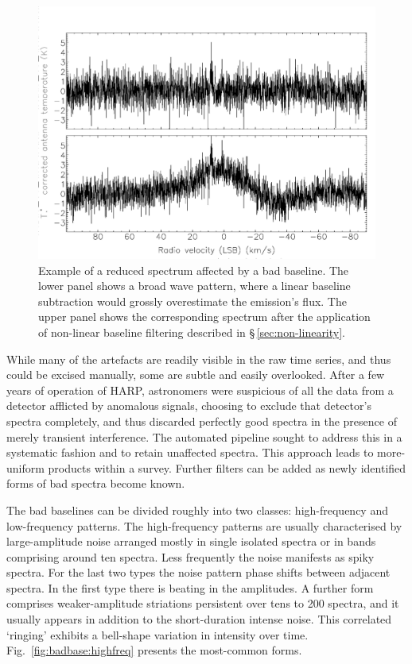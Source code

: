 \documentclass[a4paper,fleqn,usenatbib]{mnras}
\begin{document}
\begin{figure}
\includegraphics[width=\columnwidth]{badbaseline_spectrum_example}
\caption{Example of a reduced spectrum affected by a bad baseline.
  The lower panel shows a broad wave pattern, where a linear baseline
  subtraction would grossly overestimate the emission's flux.  The upper
  panel shows the corresponding spectrum after the application of
  non-linear baseline filtering described in \S\,\ref{sec:non-linearity}.}
\label{fig:badbase:spectrum}
\end{figure}


While many of the artefacts are readily visible in the raw time
series, and thus could be excised manually, some are subtle and easily
overlooked.  After a few years of operation of HARP, astronomers were
suspicious of all the data from a detector afflicted by anomalous signals,
choosing to exclude that detector's spectra completely, and thus
discarded perfectly good spectra in the presence of merely transient
interference.  The automated pipeline sought to address this
in a systematic fashion and to retain unaffected spectra.
This approach leads to more-uniform products within a survey.  Further
filters can be added as newly identified forms of bad spectra become
known.

The bad baselines can be divided roughly into two classes:
high-frequency and low-frequency patterns.  The high-frequency
patterns are usually characterised by large-amplitude noise
arranged mostly in single isolated spectra or in bands comprising
around ten spectra.  Less frequently the noise manifests as
spiky spectra.  For the last two types the noise pattern phase shifts
between adjacent spectra.  In the first type there is beating in the
amplitudes.  A further form comprises weaker-amplitude striations
persistent over tens to 200 spectra, and it usually appears in
addition to the short-duration intense noise.  This correlated
`ringing' exhibits a bell-shape variation in intensity over time.
Fig.~\ref{fig:badbase:highfreq} presents the most-common forms.
\end{document}
